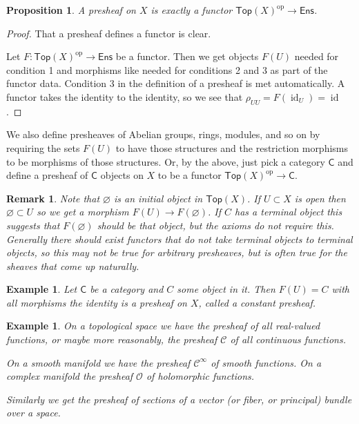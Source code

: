 \documentclass[10pt,a4paper]{article}
\newtheorem{prop}[theo]{Proposition}
\newtheorem{exam}[theo]{Example}
\newtheorem{rema}[theo]{Remark}
\newtheorem*{proof}{Proof}
\newcommand{\cc}[1]{\mathcal{#1}}
\newcommand{\sh}[1]{#1}
\newcommand{\cat}[1]{\mathsf{#1}}
\DeclareMathOperator{\id}{id}
\newcommand{\topop}[1]{\cat{Top}(#1)^{\mathrm{op}}}
\begin{document}
\begin{prop}
A presheaf on $X$ is exactly a functor $\topop{X} \to
\cat{Ens}$.
\end{prop}

\begin{proof}
That a presheaf defines a functor is clear.

Let $\sh{F} : \topop{X} \to \cat{Ens}$ be a functor.
Then we get objects $\sh{F}(U)$ needed for condition 1 and morphisms like needed
for conditions 2 and 3 as part of the functor data.
Condition 3 in the definition of a presheaf is met automatically.
A functor takes the identity to the identity, so we see that $\rho_{UU} 
= \sh{F}(\id_U) = \id$.
\end{proof}

We also define presheaves of Abelian groups, rings, modules, and so on by
requiring the sets $\sh{F}(U)$ to have those structures and the restriction
morphisms to be morphisms of those structures.
Or, by the above, just pick a category $\cat{C}$ and define a presheaf of $\cat{C}$
objects on $X$ to be a functor $\topop{X} \to \cat{C}$.

\begin{rema}
Note that $\varnothing$ is an initial object in $\cat{Top}(X)$.
If $U \subset X$ is open then $\varnothing \subset U$ so we get a morphism 
$\sh{F}(U) \to \sh{F}(\varnothing)$.
If $C$ has a terminal object this suggests that $\sh{F}(\varnothing)$ should be
that object, but the axioms do not require this.
Generally there should exist functors that do not take terminal objects to
terminal objects, so this may not be true for arbitrary presheaves, but is
often true for the sheaves that come up naturally.
\end{rema}


\begin{exam}
Let $\cat{C}$ be a category and $C$ some object in it.
Then $\sh{F}(U) = C$ with all morphisms the identity is a presheaf on $X$, called
a constant presheaf.
\end{exam}

\begin{exam}
On a topological space we have the presheaf of all real-valued functions, or
maybe more reasonably, the presheaf $\cc{C}$ of all continuous functions.

On a smooth manifold we have the presheaf $\cc{C}^\infty$ of smooth functions.
On a complex manifold the presheaf $\cc O$ of holomorphic functions.

Similarly we get the presheaf of sections of a vector (or fiber, or principal)
bundle over a space.
\end{exam}
\end{document}
